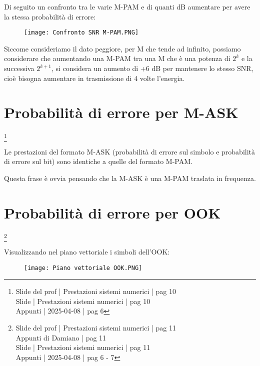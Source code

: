 \newpage

Di seguito un confronto tra le varie M-PAM e di quanti dB aumentare per avere la stessa probabilità di errore: 

\begin{figure}[h]
    \centering
    \texttt{[image: Confronto SNR M-PAM.PNG]}
\end{figure}

Siccome consideriamo il dato peggiore, 
per M che tende ad infinito, possiamo considerare che aumentando una M-PAM 
tra una M che è una potenza di $2^{k}$ e la successiva $2^{k+1}$, 
si considera un aumento di +6 dB per mantenere lo stesso SNR, cioè bisogna aumentare in trasmissione di 4 volte l'energia. \newline 

\newpage 

\section{Probabilità di errore per M-ASK}
\footnote{Slide del prof | Prestazioni sistemi numerici | pag 10 \\
Slide | Prestazioni sistemi numerici | pag 10 \\
Appunti | 2025-04-08 | pag 6
}

Le prestazioni del formato M-ASK (probabilità di errore sul simbolo e probabilità di errore sul bit) 
sono identiche a quelle del formato M-PAM. \newline 

\begin{tcolorbox}
    Questa frase è ovvia pensando che la M-ASK è una M-PAM traslata in frequenza. 
\end{tcolorbox}

\newpage 

\section{Probabilità di errore per OOK}
\footnote{Slide del prof | Prestazioni sistemi numerici | pag 11 \\
Appunti di Damiano | pag 11  \\ 
Slide | Prestazioni sistemi numerici | pag 11 \\
Appunti | 2025-04-08 | pag 6 - 7
}

Visualizzando nel piano vettoriale i simboli dell'OOK: 

\begin{figure}[h]
    \centering
    \texttt{[image: Piano vettoriale OOK.PNG]}
\end{figure}

